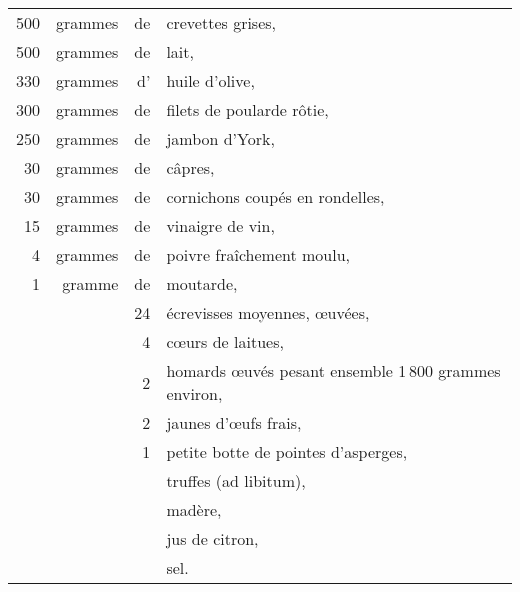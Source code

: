 \footnotesize
\begin{longtable}{rrrp{16em}}
    500 & grammes & de & crevettes grises,                                                                \\
    500 & grammes & de & lait,                                                                            \\
    330 & grammes & d' & huile d'olive,                                                                   \\
    300 & grammes & de & filets de poularde rôtie,                                                        \\
    250 & grammes & de & jambon d’York,                                                                   \\
     30 & grammes & de & câpres,                                                                          \\
     30 & grammes & de & cornichons coupés en rondelles,                                                  \\
     15 & grammes & de & vinaigre de vin,                                                                 \\
      4 & grammes & de & poivre fraîchement moulu,                                                        \\
      1 & gramme  & de & moutarde,                                                                        \\
        &         & 24 & écrevisses moyennes, œuvées,                                                     \\
        &         &  4 & cœurs de laitues,                                                                \\
        &         &  2 & homards œuvés pesant ensemble 1 800 grammes environ,                             \\
        &         &  2 & jaunes d'œufs frais,                                                             \\
        &         &  1 & petite botte de pointes d'asperges,                                              \\
        &         &    & truffes (ad libitum),                                                            \\
        &         &    & madère,                                                                          \\
        &         &    & jus de citron,                                                                   \\
        &         &    & sel.                                                                             \\
\end{longtable}
\normalsize

